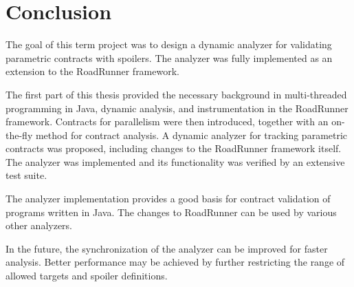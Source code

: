 \chapter{Conclusion}

The goal of this term project was to design a dynamic analyzer for validating
parametric contracts with spoilers. The analyzer was fully implemented as an
extension to the RoadRunner framework.

The first part of this thesis provided the necessary background in
multi-threaded programming in Java, dynamic analysis, and instrumentation in the
RoadRunner framework. Contracts for parallelism were then introduced, together
with an on-the-fly method for contract analysis. A dynamic analyzer for tracking
parametric contracts was proposed, including changes to the RoadRunner framework
itself. The analyzer was implemented and its functionality was verified by an
extensive test suite.

The analyzer implementation provides a good basis for contract validation of
programs written in Java. The changes to RoadRunner can be used by various other
analyzers.

In the future, the synchronization of the analyzer can be improved for faster
analysis. Better performance may be achieved by further restricting the range of
allowed targets and spoiler definitions.

\todo{}
{\color{blue}\lipsum[1-3]}
